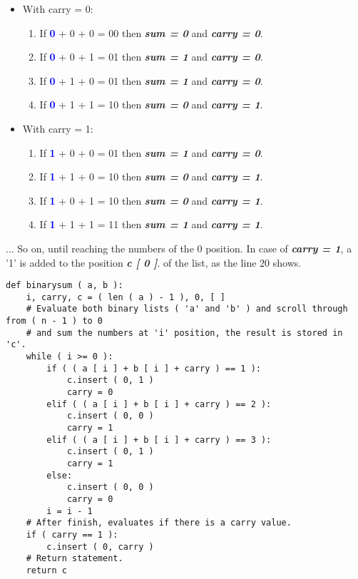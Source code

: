 \documentclass[10pt,a4paper]{article}
\begin{document}
\begin{itemize}
\item With carry = 0:
\begin{enumerate}
\item If {\bfseries\textcolor{Blue}{0}} + 0 + 0 = 00 then {\bfseries{\itshape sum = 0}} and {\bfseries{\itshape carry = 0}}.
\item If {\bfseries\textcolor{Blue}{0}} + 0 + 1 = 01 then {\bfseries{\itshape sum = 1}} and {\bfseries{\itshape carry = 0}}.
\item If {\bfseries\textcolor{Blue}{0}} + 1 + 0 = 01 then {\bfseries{\itshape sum = 1}} and {\bfseries{\itshape carry = 0}}.
\item If {\bfseries\textcolor{Blue}{0}} + 1 + 1 = 10 then {\bfseries{\itshape sum = 0}} and {\bfseries{\itshape carry = 1}}.
\end{enumerate}
\item With carry = 1:
\begin{enumerate}
\item If {\bfseries\textcolor{Blue}{1}} + 0 + 0 = 01 then {\bfseries{\itshape sum = 1}} and {\bfseries{\itshape carry = 0}}.
\item If {\bfseries\textcolor{Blue}{1}} + 1 + 0 = 10 then {\bfseries{\itshape sum = 0}} and {\bfseries{\itshape carry = 1}}.
\item If {\bfseries\textcolor{Blue}{1}} + 0 + 1 = 10 then {\bfseries{\itshape sum = 0}} and {\bfseries{\itshape carry = 1}}.
\item If {\bfseries\textcolor{Blue}{1}} + 1 + 1 = 11 then {\bfseries{\itshape sum = 1}} and {\bfseries{\itshape carry = 1}}.
\end{enumerate}
\end{itemize}

... So on, until reaching the numbers of the 0 position. In case of {\bfseries{\itshape carry = 1}}, a '1' is added to the position {\bfseries{\itshape c [ 0 ]}}. of the list, as the line 20 shows. \hfill \break

\begin{lstlisting}
def binarysum ( a, b ):
    i, carry, c = ( len ( a ) - 1 ), 0, [ ]
    # Evaluate both binary lists ( 'a' and 'b' ) and scroll through from ( n - 1 ) to 0
    # and sum the numbers at 'i' position, the result is stored in 'c'.
    while ( i >= 0 ):
        if ( ( a [ i ] + b [ i ] + carry ) == 1 ):
            c.insert ( 0, 1 )
            carry = 0
        elif ( ( a [ i ] + b [ i ] + carry ) == 2 ):
            c.insert ( 0, 0 )
            carry = 1
        elif ( ( a [ i ] + b [ i ] + carry ) == 3 ):
            c.insert ( 0, 1 )
            carry = 1
        else:
            c.insert ( 0, 0 )
            carry = 0
        i = i - 1
    # After finish, evaluates if there is a carry value.
    if ( carry == 1 ):
        c.insert ( 0, carry )
    # Return statement.
    return c
\end{lstlisting}
\end{document}
